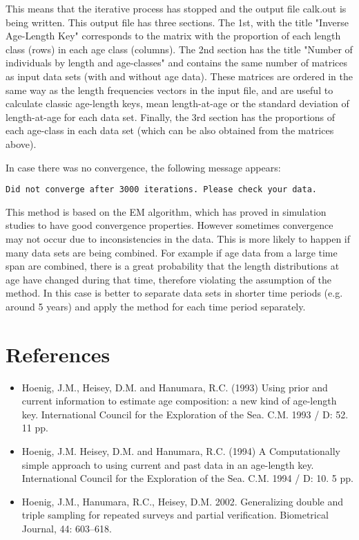 \documentclass[12pt,a4paper]{article}
\begin{document}
This means that the iterative process has stopped and the output file calk.out is being written. This output file has three sections.
 The 1st, with the title "Inverse Age-Length Key" corresponds to the matrix with the proportion of each length class (rows) in each 
age class (columns). The 2nd section has the title "Number of individuals by length and age-classes" and contains the same number of matrices as 
input data sets (with and without age data). These matrices are ordered in the same way as the length frequencies 
vectors in the input file, and are useful to calculate classic age-length keys, mean length-at-age or the standard 
deviation of length-at-age for each data set. Finally, the 3rd section has the proportions of each age-class in each 
data set (which can be also obtained from the matrices above).

In case there was no convergence, the following message appears:

\begin{verbatim}
Did not converge after 3000 iterations. Please check your data.
\end{verbatim}

This method is based on the EM algorithm, which has proved in simulation studies to have good convergence properties. However 
sometimes convergence may not occur due to inconsistencies in the data. This is more likely to happen if many data sets are 
being combined. For example if age data from a large time span are combined, there is a great probability that the length 
distributions at age have changed during that time, therefore violating the assumption of the method. In this case is better to separate data sets 
in shorter time periods (e.g. around 5 years) and apply the method for each time period separately.


\section{References}
\begin{itemize}
\item Hoenig, J.M., Heisey, D.M. and Hanumara, R.C. (1993) Using prior and current information to estimate age composition: a new kind of age-length key. International Council for the Exploration of the Sea. C.M. 1993 / D: 52. 11 pp.

\item Hoenig, J.M. Heisey, D.M. and Hanumara, R.C. (1994) A Computationally simple approach to using current and past data in an age-length key. International Council for the Exploration of the Sea. C.M. 1994 / D: 10. 5 pp.

\item Hoenig, J.M., Hanumara, R.C., Heisey, D.M. 2002. Generalizing double and triple sampling for repeated surveys and partial verification. Biometrical Journal, 44: 603–618.
\end{itemize}
\end{document}
